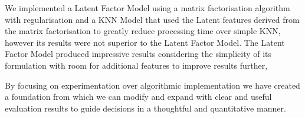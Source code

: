 \documentclass[12pt]{article}
\begin{document}
We implemented a Latent Factor Model using a matrix factorisation algorithm with regularisation and a KNN Model that used the Latent features derived from the matrix factorisation to greatly reduce processing time over simple KNN, however its results were not superior to the Latent Factor Model. The Latent Factor Model produced impressive results considering the simplicity of its formulation with room for additional features to improve results further,

By focusing on experimentation over algorithmic implementation we have created a foundation from which we can modify and expand with clear and useful evaluation results to guide decisions in a thoughtful and quantitative manner.


%



\end{document}
